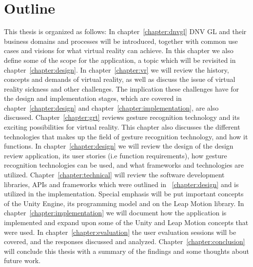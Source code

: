 \section{Outline}
This thesis is organized as follows: In chapter~\ref{chapter:dnvgl} DNV GL and their business domains and processes will be introduced, together with common use cases
and visions for what virtual reality can achieve. In this chapter we also define some of the scope for the application, a topic which will be revisited in 
chapter~\ref{chapter:design}. In chapter~\ref{chapter:vr} we will review the history, concepts and demands of virtual reality, as well as discuss the issue of virtual reality
sickness and other challenges. The implication these challenges have for the design and implementation stages, which are covered in chapter~\ref{chapter:design} and
chapter~\ref{chapter:implementation}, are also discussed. Chapter~\ref{chapter:grt} reviews gesture recognition technology and its exciting possibilities for virtual reality.
This chapter also discusses the different technologies that makes up the field of gesture recognition technology, and how it functions. 
In chapter~\ref{chapter:design} we will review the design of the design review application, its user stories (i.e function requirements), how gesture recognition technologies
can be used, and what frameworks and technologies are utilized. Chapter~\ref{chapter:technical} will review the software development libraries, APIs and frameworks
which were outlined in ~\ref{chapter:design} and is utilized in the implementation. Special emphasis will be put important concepts of the Unity Engine, its programming model
and on the Leap Motion library.  
In chapter~\ref{chapter:implementation} we will document how the application is implemented and expand upon some of the Unity and Leap Motion concepts that were used.
In chapter~\ref{chapter:evaluation} the user evaluation sessions will be covered, and the responses discussed and analyzed.
Chapter~\ref{chapter:conclusion} will conclude this thesis with a summary of the findings and some thoughts about future work.


